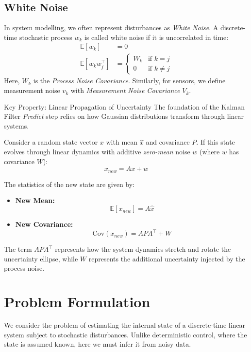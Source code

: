 \subsection{White Noise}
In system modelling, we often represent disturbances as \emph{White Noise}. A discrete-time stochastic process $w_k$ is called white noise if it is uncorrelated in time:
\begin{equation*}
	\begin{aligned}
		\mathbb{E}[w_k] &= 0 \\
		\mathbb{E}[w_k w_j^\top] &= \begin{cases} W_k & \text{if } k = j \\ 0 & \text{if } k \neq j \end{cases}
	\end{aligned}
\end{equation*}
Here, $W_k$ is the \emph{Process Noise Covariance}. Similarly, for sensors, we define measurement noise $v_k$ with \emph{Measurement Noise Covariance} $V_k$.

\begin{summarybox}{Key Property: Linear Propagation of Uncertainty}
	The foundation of the Kalman Filter \emph{Predict} step relies on how Gaussian distributions transform through linear systems.
	
	Consider a random state vector $x$ with mean $\hat{x}$ and covariance $P$. If this state evolves through linear dynamics with additive \emph{zero-mean} noise $w$ (where $w$ has covariance $W$):
	\[ x_{new} = A x + w \]
	
	The statistics of the new state are given by:
	\begin{itemize}
		\item \textbf{New Mean:} 
		\[ \mathbb{E}[x_{new}] = A\hat{x} \]
		\item \textbf{New Covariance:} 
		\[ \text{Cov}(x_{new}) = A P A^\top + W \]
	\end{itemize}
	
	The term $A P A^\top$ represents how the system dynamics stretch and rotate the uncertainty ellipse, while $W$ represents the additional uncertainty injected by the process noise.
\end{summarybox}

\section{Problem Formulation}

We consider the problem of estimating the internal state of a discrete-time linear system subject to stochastic disturbances. Unlike deterministic control, where the state is assumed known, here we must infer it from noisy data.

